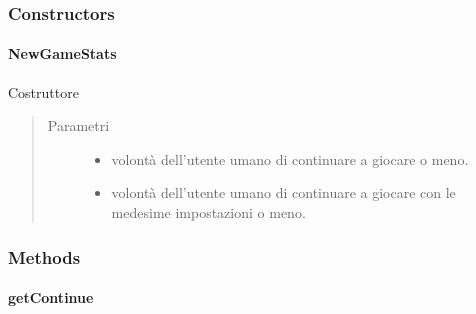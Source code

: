 \documentclass[letterpaper,10pt,italian]{sphinxmanual}
\begin{document}
\subsubsection{Constructors}
\label{\detokenize{source/it/unicam/cs/pa/mastermind/gamecore/NewGameStats:constructors}}

\paragraph{NewGameStats}
\label{\detokenize{source/it/unicam/cs/pa/mastermind/gamecore/NewGameStats:id1}}

\begin{fulllineitems}
\label{\detokenize{source/it/unicam/cs/pa/mastermind/gamecore/NewGameStats:it.unicam.cs.pa.mastermind.gamecore.NewGameStats.NewGameStats(boolean, boolean)}}
Costruttore
\begin{quote}\begin{description}
\item[{Parametri}] \leavevmode\begin{itemize}
\item {} 
 \textendash{} volontà dell’utente umano di continuare a giocare o meno.

\item {} 
 \textendash{} volontà dell’utente umano di continuare a giocare con le medesime impostazioni o meno.

\end{itemize}

\end{description}\end{quote}

\end{fulllineitems}



\subsubsection{Methods}
\label{\detokenize{source/it/unicam/cs/pa/mastermind/gamecore/NewGameStats:methods}}

\paragraph{getContinue}
\label{\detokenize{source/it/unicam/cs/pa/mastermind/gamecore/NewGameStats:getcontinue}}
\end{document}
